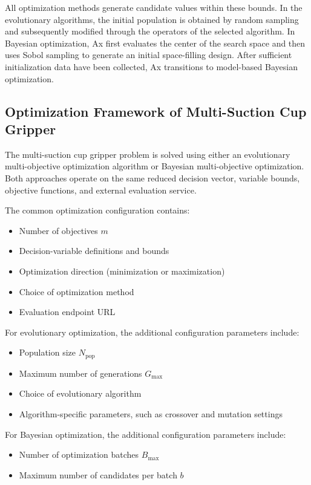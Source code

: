 All optimization methods generate candidate values within these bounds. In the evolutionary
algorithms, the initial population is obtained by random sampling and subsequently modified through
the operators of the selected algorithm. In Bayesian optimization, Ax first evaluates the center of
the search space and then uses Sobol sampling to generate an initial space-filling design. After
sufficient initialization data have been collected, Ax transitions to model-based Bayesian
optimization.

\subsection{Optimization Framework of Multi-Suction Cup Gripper}
\label{sec:optimzation_framework_sc}

The multi-suction cup gripper problem is solved using either an evolutionary multi-objective
optimization algorithm or Bayesian multi-objective optimization. Both approaches operate on the same
reduced decision vector, variable bounds, objective functions, and external evaluation service.

The common optimization configuration contains:
\begin{itemize}
    \item Number of objectives $m$
    \item Decision-variable definitions and bounds
    \item Optimization direction (minimization or maximization)
    \item Choice of optimization method
    \item Evaluation endpoint URL
\end{itemize}

For evolutionary optimization, the additional configuration parameters include:
\begin{itemize}
    \item Population size $N_{\mathrm{pop}}$
    \item Maximum number of generations $G_{\max}$
    \item Choice of evolutionary algorithm
    \item Algorithm-specific parameters, such as crossover and mutation settings
\end{itemize}

For Bayesian optimization, the additional configuration parameters include:
\begin{itemize}
    \item Number of optimization batches $B_{\max}$
    \item Maximum number of candidates per batch $b$
\end{itemize}

